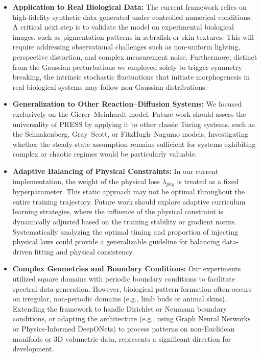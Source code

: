 \documentclass{article} %
\begin{document}
\begin{itemize}

\item \textbf{Application to Real Biological Data:} The current framework relies on high-fidelity synthetic data generated under controlled numerical conditions. A critical next step is to validate the model on experimental biological images, such as pigmentation patterns in zebrafish or skin textures. This will require addressing observational challenges such as non-uniform lighting, perspective distortion, and complex measurement noise. Furthermore, distinct from the Gaussian perturbations we employed solely to trigger symmetry breaking, the intrinsic stochastic fluctuations that initiate morphogenesis in real biological systems may follow non-Gaussian distributions.

\item \textbf{Generalization to Other Reaction–Diffusion Systems:} We focused exclusively on the Gierer–Meinhardt model. Future work should assess the universality of PRESS by applying it to other classic Turing systems, such as the Schnakenberg, Gray–Scott, or FitzHugh–Nagumo models. Investigating whether the steady-state assumption remains sufficient for systems exhibiting complex or chaotic regimes would be particularly valuable.

\item \textbf{Adaptive Balancing of Physical Constraints:} In our current implementation, the weight of the physical loss $\lambda_{phy}$ is treated as a fixed hyperparameter. This static approach may not be optimal throughout the entire training trajectory. Future work should explore adaptive curriculum learning strategies, where the influence of the physical constraint is dynamically adjusted based on the training stability or gradient norms. Systematically analyzing the optimal timing and proportion of injecting physical laws could provide a generalizable guideline for balancing data-driven fitting and physical consistency.

\item \textbf{Complex Geometries and Boundary Conditions:} Our experiments utilized square domains with periodic boundary conditions to facilitate spectral data generation. However, biological pattern formation often occurs on irregular, non-periodic domains (e.g., limb buds or animal skins). Extending the framework to handle Dirichlet or Neumann boundary conditions, or adapting the architecture (e.g., using Graph Neural Networks or Physics-Informed DeepONets) to process patterns on non-Euclidean manifolds or 3D volumetric data, represents a significant direction for development.

\end{itemize}
\end{document}
